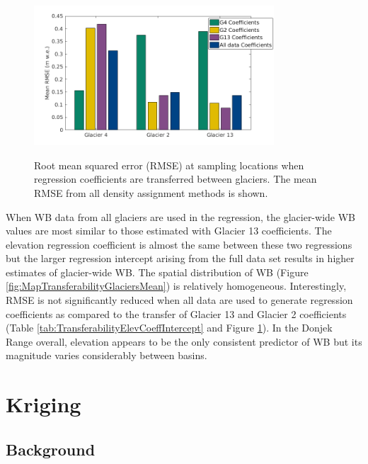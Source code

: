 \documentclass{sfuthesis}
\begin{document}
\begin{figure}[H]
	\centering
	\includegraphics[width =0.8\textwidth]{TransferabilityRMSE.png}\\
	\caption[Root mean squared error (RMSE) at sampling locations when regression coefficients are transferred between glaciers]{Root mean squared error (RMSE) at sampling locations when regression coefficients are transferred between glaciers. The mean RMSE from all density assignment methods is shown.}
	\label{fig:TransferabilityRMSE}
\end{figure}

When WB data from all glaciers are used in the regression, the glacier-wide WB values are most similar to those estimated with Glacier 13 coefficients.  The elevation regression coefficient is almost the same between these two regressions but the larger regression intercept arising from the full data set results in higher estimates of glacier-wide WB. The spatial distribution of WB (Figure \ref{fig:MapTransferabilityGlaciersMean}) is relatively homogeneous. Interestingly, RMSE is not significantly reduced when all data are used to generate regression coefficients as compared to the transfer of Glacier 13 and Glacier 2 coefficients (Table \ref{tab:TransferabilityElevCoeffIntercept} and Figure \ref{fig:TransferabilityRMSE}). In the Donjek Range overall, elevation appears to be the only consistent predictor of WB but its magnitude varies considerably between basins. 


\section{Kriging}
\label{sec:kriging}

\subsection{Background}
\end{document}
